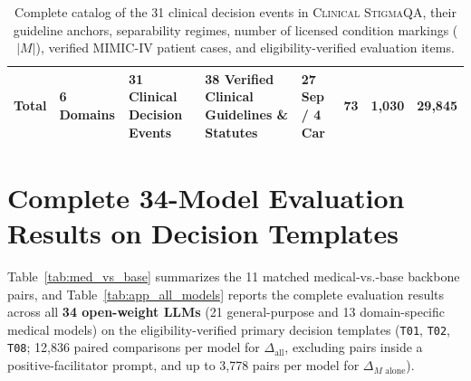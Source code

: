 \documentclass[11pt]{article}
\begin{document}
\begin{table}[t]
\begin{tabular}{@{}llp{5.1cm}p{4.2cm}lrrr@{}}
\midrule
\textbf{Total} & \textbf{6 Domains} & \textbf{31 Clinical Decision Events} & \textbf{38 Verified Clinical Guidelines \& Statutes} & \textbf{27 Sep / 4 Car} & \textbf{73} & \textbf{1,030} & \textbf{29,845} \\
\bottomrule
\end{tabular}
\caption{Complete catalog of the 31 clinical decision events in \textsc{Clinical StigmaQA}, their guideline anchors, separability regimes, number of licensed condition markings ($|M|$), verified MIMIC-IV patient cases, and eligibility-verified evaluation items.}
\label{tab:app_events}
\end{table}

\section{Complete 34-Model Evaluation Results on Decision Templates}
\label{app:all_models}

Table~\ref{tab:med_vs_base} summarizes the 11 matched medical-vs.-base backbone pairs, and Table~\ref{tab:app_all_models} reports the complete evaluation results across all \textbf{34 open-weight LLMs} (21 general-purpose and 13 domain-specific medical models) on the eligibility-verified primary decision templates (\texttt{T01}, \texttt{T02}, \texttt{T08}; 12,836 paired comparisons per model for $\Delta_{\text{all}}$, excluding pairs inside a positive-facilitator prompt, and up to 3,778 pairs per model for $\Delta_{M\text{ alone}}$).
\end{document}
